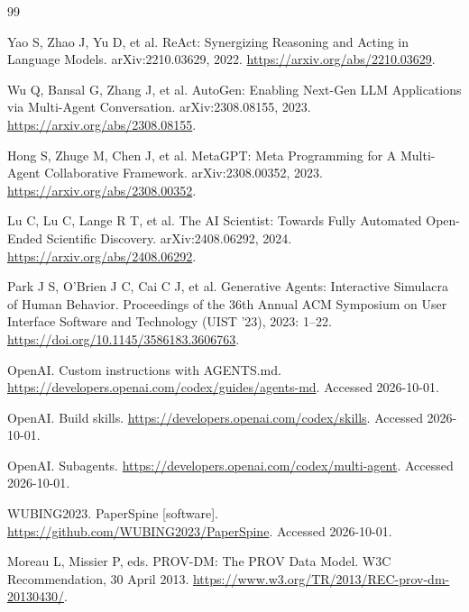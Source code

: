 \documentclass[UTF8,fontset=fandol,a4paper,11pt]{ctexart}
\begin{document}
\begin{thebibliography}{99}

 Yao S, Zhao J, Yu D, et al. ReAct: Synergizing Reasoning and Acting in Language Models. arXiv:2210.03629, 2022. \url{https://arxiv.org/abs/2210.03629}.

 Wu Q, Bansal G, Zhang J, et al. AutoGen: Enabling Next-Gen LLM Applications via Multi-Agent Conversation. arXiv:2308.08155, 2023. \url{https://arxiv.org/abs/2308.08155}.

 Hong S, Zhuge M, Chen J, et al. MetaGPT: Meta Programming for A Multi-Agent Collaborative Framework. arXiv:2308.00352, 2023. \url{https://arxiv.org/abs/2308.00352}.

 Lu C, Lu C, Lange R T, et al. The AI Scientist: Towards Fully Automated Open-Ended Scientific Discovery. arXiv:2408.06292, 2024. \url{https://arxiv.org/abs/2408.06292}.

 Park J S, O’Brien J C, Cai C J, et al. Generative Agents: Interactive Simulacra of Human Behavior. Proceedings of the 36th Annual ACM Symposium on User Interface Software and Technology (UIST '23), 2023: 1–22. \url{https://doi.org/10.1145/3586183.3606763}.

 OpenAI. Custom instructions with AGENTS.md. \url{https://developers.openai.com/codex/guides/agents-md}. Accessed 2026-10-01.

 OpenAI. Build skills. \url{https://developers.openai.com/codex/skills}. Accessed 2026-10-01.

 OpenAI. Subagents. \url{https://developers.openai.com/codex/multi-agent}. Accessed 2026-10-01.

 WUBING2023. PaperSpine [software]. \url{https://github.com/WUBING2023/PaperSpine}. Accessed 2026-10-01.

 Moreau L, Missier P, eds. PROV-DM: The PROV Data Model. W3C Recommendation, 30 April 2013. \url{https://www.w3.org/TR/2013/REC-prov-dm-20130430/}.
\end{thebibliography}
\end{document}
